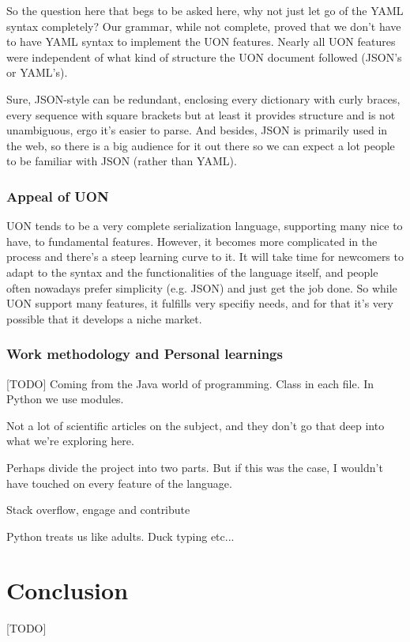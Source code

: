 \documentclass[12pt]{article}
\begin{document}
So the question here that begs to be asked here, why not just let go of the YAML syntax completely? Our grammar, while not complete, proved that we don't have to have YAML syntax to implement the UON features. Nearly all UON features were independent of what kind of structure the UON document followed (JSON's or YAML's). 

Sure, JSON-style can be redundant, enclosing every dictionary with curly braces, every sequence with square brackets but at least it provides structure and is not unambiguous, ergo it's easier to parse. And besides, JSON is primarily used in the web, so there is a big audience for it out there so we can expect a lot people to be familiar with JSON (rather than YAML).

\subsubsection{Appeal of UON}
UON tends to be a very complete serialization language, supporting many nice to have, to fundamental features. However, it becomes more complicated in the process and there's a steep learning curve to it. It will take time for newcomers to adapt to the syntax and the functionalities of the language itself, and people often nowadays prefer simplicity (e.g. JSON) and just get the job done. So while UON support many features, it fulfills very specifiy needs, and for that it's very possible that it develops a niche market.

\subsubsection{Work methodology and Personal learnings}
[TODO]
Coming from the Java world of programming. Class in each file. In Python we use modules.

Not a lot of scientific articles on the subject, and they don't go that deep into what we're exploring here.

Perhaps divide the project into two parts. But if this was the case, I wouldn't have touched on every feature of the language.

Stack overflow, engage and contribute

Python treats us like adults. Duck typing etc...

\pagebreak

\section{Conclusion}
[TODO]
\end{document}
